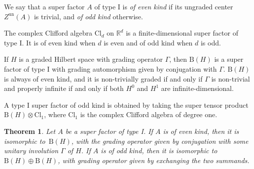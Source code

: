 \documentclass[11pt]{article}
\numberwithin{equation}{section}
\numberwithin{equation}{section}
\newtheorem{Theorem}{Theorem}[section]
\newcommand{\R}{\mathbb{R}}
\newcommand{\B}{\mathrm{B}}
\newcommand{\Cl}{\mathrm{Cl}}
\begin{document}
\begin{Definition}
We say that a super factor $A$ of type I is \emph{of even kind} if its ungraded center $Z^{\mathrm{un}}(A)$ is trivial, and \emph{of odd kind} otherwise.	
\end{Definition}

\begin{Example} \label{ExampleFiniteDimensional}
 The complex Clifford algebra $\Cl_d$ on $\R^d$ is a finite-dimensional super factor of type I.
 It is of even kind when $d$ is even and of odd kind when $d$ is odd.
\end{Example}

\begin{Example} \label{ExampleOddKind}
If $H$ is a graded Hilbert space with grading operator $\Gamma$, then $\B(H)$ is a super factor of type I with grading automorphism given by conjugation with $\Gamma$.
$\B(H)$ is always of even kind, and it is non-trivially graded if and only if $\Gamma$ is non-trivial and properly infinite if and only if both $H^0$ and $H^1$ are infinite-dimensional.
\end{Example}

\begin{Example} \label{ExampleEvenKind}
A type I super factor of odd kind is obtained by taking the super tensor product~${\B(H) \otimes \Cl_1}$, where $\Cl_1$ is the complex Clifford algebra of degree one.
\end{Example}


\begin{Theorem}
\label{ThmClassificationSuperFactorI}
Let $A$ be a super factor of type I.
If $A$ is of even kind, then it is isomorphic to~$\B(H)$, with the grading operator given by conjugation with some unitary involution $\Gamma$ of $H$.
If $A$ is of odd kind, then it is isomorphic to $\B(H) \oplus \B(H)$, with grading operator given by exchanging the two summands.
\end{Theorem}
\end{document}
